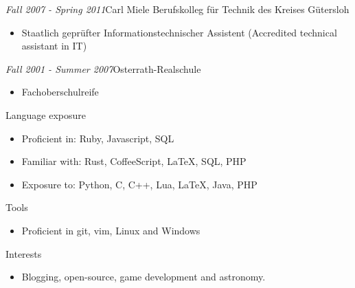 \documentclass[12pt]{article}
\begin{document}
\emph{Fall 2007 - Spring 2011}\hfill Carl Miele Berufskolleg für Technik des Kreises Gütersloh
\begin{itemize}
  \setlength{\itemsep}{0cm}
  \setlength{\parskip}{0.1cm}
  \item[] Staatlich geprüfter Informationstechnischer Assistent (Accredited technical assistant in IT)
\end{itemize}

\emph{Fall 2001 - Summer 2007}\hfill Osterrath-Realschule
\begin{itemize}
  \setlength{\itemsep}{0cm}
  \setlength{\parskip}{0.1cm}
  \item[] Fachoberschulreife
\end{itemize}

\vspace{0.5cm}
{\Large Language exposure}
\begin{itemize}
  \setlength{\itemsep}{0cm}
  \setlength{\parskip}{0cm}
  \item[] Proficient in: Ruby, Javascript, SQL
  \item[] Familiar with: Rust, CoffeeScript, LaTeX, SQL, PHP
  \item[] Exposure to: Python, C, C++, Lua, LaTeX, Java, PHP
\end{itemize}

\vspace{0.5cm}
{\Large Tools}
\begin{itemize}
  \setlength{\itemsep}{0cm}
  \setlength{\parskip}{0cm}
  \item[] Proficient in git, vim, Linux and Windows
\end{itemize}

\vspace{0.5cm}
{\Large Interests}
\begin{itemize}
  \setlength{\itemsep}{0cm}
  \setlength{\parskip}{0cm}
  \item[] Blogging, open-source, game development and astronomy.
\end{itemize}
\end{document}
